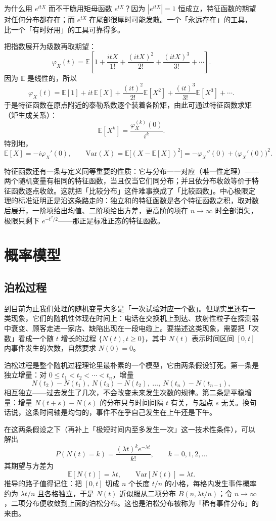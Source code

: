 \documentclass[UTF8]{ctexbook}
\begin{document}
为什么用 $e^{itX}$ 而不干脆用矩母函数 $e^{tX}$？因为 $|e^{itX}|=1$ 恒成立，特征函数的期望对任何分布都存在；而 $e^{tX}$ 在尾部很厚时可能发散。一个「永远存在」的工具，比一个「有时好用」的工具可靠得多。

把指数展开为级数再取期望：
\[
\varphi_X(t)=\mathbb{E}\!\left[1+\frac{itX}{1!}+\frac{(itX)^2}{2!}+\frac{(itX)^3}{3!}+\cdots\right].
\]
因为 $\mathbb{E}$ 是线性的，所以
\[
\varphi_X(t)
=\mathbb{E}[1]+it\,\mathbb{E}[X]+\frac{(it)^2}{2!}\mathbb{E}[X^2]+\frac{(it)^3}{3!}\mathbb{E}[X^3]+\cdots.
\]
于是特征函数在原点附近的泰勒系数逐个装着各阶矩，由此可通过特征函数求矩（矩生成关系）：
\[
\mathbb{E}[X^k]=\frac{\varphi_X^{(k)}(0)}{i^k}.
\]
特别地，
\[
\mathbb{E}[X]=-i\varphi_X'(0),
\qquad
\mathrm{Var}(X)=\mathbb{E}\!\bigl[(X-\mathbb{E}[X])^2\bigr]
=-\varphi_X''(0)+\bigl(\varphi_X'(0)\bigr)^2.
\]

特征函数还有一条与定义同等重要的性质：它与分布一一对应（唯一性定理）——两个随机变量有相同的特征函数，当且仅当它们同分布；并且依分布收敛等价于特征函数逐点收敛。这就把「比较分布」这件难事换成了「比较函数」。中心极限定理的标准证明正是沿这条路走的：独立和的特征函数是各个特征函数之积，取对数后展开，一阶项给出均值、二阶项给出方差，更高阶的项在 $n\to\infty$ 时全部消失，极限只剩下 $e^{-t^2/2}$——那正是标准正态的特征函数。

\section{概率模型}

\subsection{泊松过程}

到目前为止我们处理的随机变量大多是「一次试验对应一个数」。但现实里还有一类现象，它们的随机性体现在时间上：电话在交换机上到达、放射性粒子在探测器中衰变、顾客走进一家店、缺陷出现在一段电缆上。要描述这类现象，需要把「次数」看成一个随 $t$ 增长的过程 $\{N(t),t\ge 0\}$，其中 $N(t)$ 表示时间区间 $[0,t]$ 内事件发生的次数，自然要求 $N(0)=0$。

泊松过程是整个随机过程理论里最朴素的一个模型，它由两条假设钉死。第一条是独立增量：对 $0\le t_1<t_2<\cdots<t_n$，增量
\[
N(t_2)-N(t_1),\ N(t_3)-N(t_2),\ \dots,\ N(t_n)-N(t_{n-1}),
\]
相互独立——过去发生了几次，不会改变未来发生次数的规律。第二条是平稳增量：增量 $N(t+s)-N(s)$ 的分布只与时间间隔 $t$ 有关，与起点 $s$ 无关。换句话说，这条时间轴是均匀的，事件不在乎自己发生在上午还是下午。

在这两条假设之下（再补上「极短时间内至多发生一次」这一技术性条件），可以解出
\[
P(N(t)=k)=\frac{(\lambda t)^k e^{-\lambda t}}{k!},\qquad k=0,1,2,\dots
\]
其期望与方差为
\[
\mathbb{E}[N(t)]=\lambda t,\qquad \mathrm{Var}[N(t)]=\lambda t.
\]
推导的路子值得记住：把 $[0,t]$ 切成 $n$ 个长度 $t/n$ 的小格，每格内发生事件概率约为 $\lambda t/n$ 且各格独立，于是 $N(t)$ 近似服从二项分布 $B(n,\lambda t/n)$；令 $n\to\infty$，二项分布便收敛到上面的泊松分布。这也是泊松分布被称为「稀有事件分布」的来由。
\end{document}
